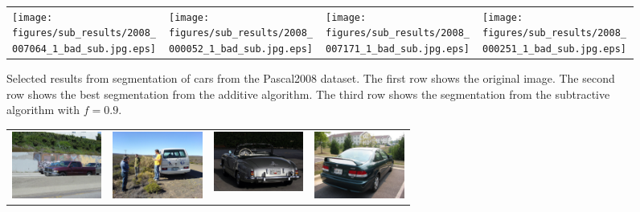 \documentclass[10pt,twocolumn,letterpaper]{article}
\begin{document}
\begin{figure}[p]
\begin{tabular}{ p{3cm} p{3cm} p{3cm} p{3cm} }
\texttt{[image: figures/sub\_results/2008\_007064\_1\_bad\_sub.jpg.eps]} &
\texttt{[image: figures/sub\_results/2008\_000052\_1\_bad\_sub.jpg.eps]} &
\texttt{[image: figures/sub\_results/2008\_007171\_1\_bad\_sub.jpg.eps]} &
\texttt{[image: figures/sub\_results/2008\_000251\_1\_bad\_sub.jpg.eps]} \\
\end{tabular}
\caption{Selected results from segmentation of cars from the Pascal2008
dataset.  The first row shows the original image.  The second row shows
the best segmentation from the additive algorithm.  The third row shows
the segmentation from the subtractive algorithm with $f=0.9$.}
\label{fig:car_good_results}
\end{figure}


\begin{figure}[p]
\centering
\begin{tabular}{ p{3cm} p{3cm} p{3cm} p{3cm} }
\includegraphics[width=2.95cm]{figures/add_res/car/bad/2008_001961.jpg.eps} &
\includegraphics[width=2.95cm]{figures/add_res/car/bad/2008_003132.jpg.eps} &
\includegraphics[width=2.95cm]{figures/add_res/car/bad/2008_004312.jpg.eps} &
\includegraphics[width=2.95cm]{figures/add_res/car/bad/2008_004414.jpg.eps} \\


\end{tabular}
\end{figure}
\end{document}

